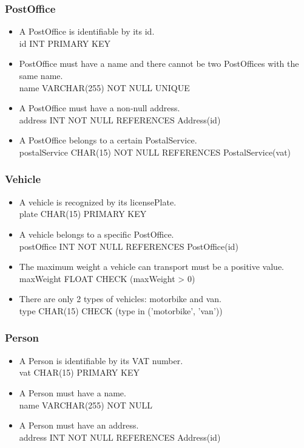\documentclass{report}[a4paper]
\theoremstyle{remark}
\begin{document}
\subsubsection{PostOffice}
\begin{itemize}
    \item A PostOffice is identifiable by its id. \\ id INT PRIMARY KEY
    \item PostOffice must have a name and there cannot be two PostOffices with the same name. \\ name VARCHAR(255) NOT NULL UNIQUE
    \item A PostOffice must have a non-null address. \\ address INT NOT NULL REFERENCES Address(id)
    \item A PostOffice belongs to a certain PostalService. \\ postalService CHAR(15) NOT NULL REFERENCES PostalService(vat)
\end{itemize}
\subsubsection{Vehicle}
\begin{itemize}
    \item A vehicle is recognized by its licensePlate. \\ plate CHAR(15) PRIMARY KEY
    \item A vehicle belongs to a specific PostOffice. \\ postOffice INT NOT NULL REFERENCES PostOffice(id)
    \item The maximum weight a vehicle can transport must be a positive value. \\ maxWeight FLOAT CHECK (maxWeight > 0)
    \item There are only 2 types of vehicles: motorbike and van. \\ type CHAR(15) CHECK (type in ('motorbike', 'van'))
\end{itemize}
\subsubsection{Person}
\begin{itemize}
    \item A Person is identifiable by its VAT number. \\ vat CHAR(15) PRIMARY KEY
    \item A Person must have a name. \\ name VARCHAR(255) NOT NULL
    \item A Person must have an address. \\ address INT NOT NULL REFERENCES Address(id)
\end{itemize}
\end{document}
